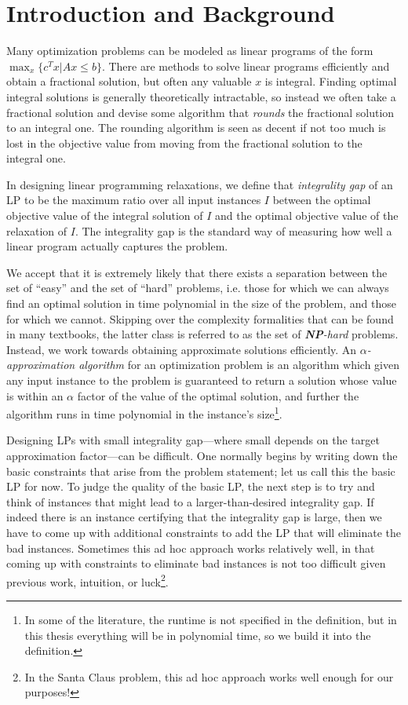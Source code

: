 \chapter{Introduction and Background}

Many optimization problems can be modeled as linear programs of the form $\max_x\{c^T x | Ax \leq b\}$.
There are methods to solve linear programs efficiently and obtain a fractional solution, 
but often any valuable $x$ is integral. 
Finding optimal integral solutions is generally theoretically intractable, 
so instead we often take a fractional solution and devise some algorithm that \emph{rounds} 
the fractional solution to an integral one. 
The rounding algorithm is seen as decent if not too much is lost in the objective value from moving from the fractional solution to the integral one.


In designing linear programming relaxations, we define that \emph{integrality gap} of an LP
to be the maximum ratio over all input instances $I$ between the optimal objective value of the integral solution of $I$ and the optimal objective value of 
the relaxation of $I$.
The integrality gap is the standard way of measuring 
how well a linear program actually captures the problem. 


We accept that it is extremely likely that there exists a separation 
between the set of ``easy'' and the set of ``hard'' problems, i.e. those for which we can always find an optimal solution in time polynomial in the 
size of the problem, and those for which we cannot. Skipping over the complexity formalities that can be found in many textbooks, the latter class is referred to as
the set of \emph{\textbf{NP}-hard} problems.
Instead, we work towards obtaining approximate solutions efficiently. 
An \emph{$\alpha$-approximation algorithm} for an optimization problem is
an algorithm which given any input instance to the problem is guaranteed to return a solution whose value is
within an $\alpha$ factor 
of the value of the optimal solution, and further  the algorithm runs in time polynomial in the instance's size\footnote{In some of the literature, 
the runtime is not specified in the definition, but in this thesis everything will be in polynomial time, so we build it into the definition.}.

Designing LPs with small integrality gap---where small depends on the target approximation factor---can be difficult. 
One normally begins by writing down the basic constraints that arise from the problem statement; let us call this the basic LP for now. 
To judge the quality of the basic LP, the next step is to try and think of instances that might lead to a larger-than-desired integrality gap.
If indeed there is an instance certifying that the integrality gap is large, then we have to come up 
with additional constraints to add the LP that will eliminate the bad instances. 
Sometimes this ad hoc approach works relatively well, in that coming up with constraints to eliminate bad instances 
is not too difficult given previous work, intuition, or luck\footnote{In the Santa Claus problem, this ad hoc approach works well enough for our purposes!}.

